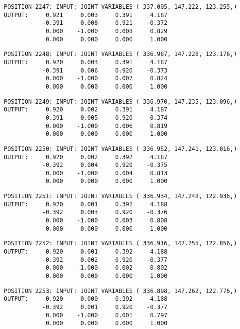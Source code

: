 \begin{verbatim}
POSITION 2247: INPUT: JOINT VARIABLES ( 337.005, 147.222, 123.255,)
OUTPUT:     0.921     0.003     0.391     4.187
           -0.391     0.008     0.921    -0.372
            0.000    -1.000     0.008     0.829
            0.000     0.000     0.000     1.000
\end{verbatim} \pagebreak[1]\begin{verbatim}
POSITION 2248: INPUT: JOINT VARIABLES ( 336.987, 147.228, 123.176,)
OUTPUT:     0.920     0.003     0.391     4.187
           -0.391     0.006     0.920    -0.373
            0.000    -1.000     0.007     0.824
            0.000     0.000     0.000     1.000
\end{verbatim} \pagebreak[1]\begin{verbatim}
POSITION 2249: INPUT: JOINT VARIABLES ( 336.970, 147.235, 123.096,)
OUTPUT:     0.920     0.002     0.391     4.187
           -0.391     0.005     0.920    -0.374
            0.000    -1.000     0.006     0.819
            0.000     0.000     0.000     1.000
\end{verbatim} \pagebreak[1]\begin{verbatim}
POSITION 2250: INPUT: JOINT VARIABLES ( 336.952, 147.241, 123.016,)
OUTPUT:     0.920     0.002     0.392     4.187
           -0.392     0.004     0.920    -0.375
            0.000    -1.000     0.004     0.813
            0.000     0.000     0.000     1.000
\end{verbatim} \pagebreak[1]\begin{verbatim}
POSITION 2251: INPUT: JOINT VARIABLES ( 336.934, 147.248, 122.936,)
OUTPUT:     0.920     0.001     0.392     4.188
           -0.392     0.003     0.920    -0.376
            0.000    -1.000     0.003     0.808
            0.000     0.000     0.000     1.000
\end{verbatim} \pagebreak[1]\begin{verbatim}
POSITION 2252: INPUT: JOINT VARIABLES ( 336.916, 147.255, 122.856,)
OUTPUT:     0.920     0.001     0.392     4.188
           -0.392     0.002     0.920    -0.377
            0.000    -1.000     0.002     0.802
            0.000     0.000     0.000     1.000
\end{verbatim} \pagebreak[1]\begin{verbatim}
POSITION 2253: INPUT: JOINT VARIABLES ( 336.898, 147.262, 122.776,)
OUTPUT:     0.920     0.000     0.392     4.188
           -0.392     0.001     0.920    -0.377
            0.000    -1.000     0.001     0.797
            0.000     0.000     0.000     1.000
\end{verbatim} \pagebreak[1]\begin{verbatim}

\end{verbatim}
